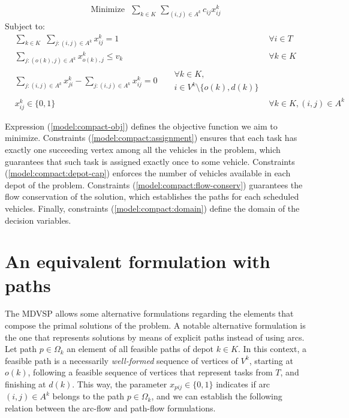 \documentclass{article}
\begin{document}
\noindent
\begin{minipage}{\linewidth}
\begin{align}
   \mathrm{Minimize~~~}\sum_{k \in K} \, \sum_{(i,j) \in A^k} c_{ij} x^k_{ij} \label{model:compact-obj}
\end{align}
\qquad Subject to:
\begin{align}
   & \sum_{k \in K} \,\, \sum_{j:(i,j) \in A^k} x^k_{ij} = 1 & & \forall i \in T \label{model:compact:assignment}\\
   & \sum_{j : (o(k), j) \in A^k} x^k_{o(k), j} \leqslant v_k & & \forall k \in K \label{model:compact:depot-cap}\\
   & \sum_{j : (i,j) \in A^k} x^k_{ji} - \sum_{j : (i,j) \in A^k} x^k_{ij} = 0 &
   \begin{split}
      & \forall k \in K, \\
      & i \in V^k \setminus \{o(k), d(k)\}
   \end{split} \label{model:compact:flow-conserv}\\[4pt]
   & x^k_{ij} \in \{0, 1\} & & \forall k \in K, (i,j) \in A^k \label{model:compact:domain}
\end{align}
\end{minipage}

\vspace*{12pt}

Expression (\ref{model:compact-obj}) defines the objective function we aim to minimize. Constraints (\ref{model:compact:assignment}) ensures that each task has exactly one succeeding vertex among all the vehicles in the problem, which guarantees that such task is assigned exactly once to some vehicle. Constraints (\ref{model:compact:depot-cap}) enforces the number of vehicles available in each depot of the problem. Constraints (\ref{model:compact:flow-conserv}) guarantees the flow conservation of the solution, which establishes the paths for each scheduled vehicles. Finally, constraints (\ref{model:compact:domain}) define the domain of the decision variables.

\section{An equivalent formulation with paths}

The MDVSP allows some alternative formulations regarding the elements that compose the primal solutions of the problem. A notable alternative formulation is the one that represents solutions by means of explicit paths instead of using arcs. Let path $p \in \Omega_k$ an element of all feasible paths of depot $k \in K$. In this context, a feasible path is a necessarily \textit{well-formed} sequence of vertices of $V^k$, starting at $o(k)$, following a feasible sequence of vertices that represent tasks from $T$, and finishing at $d(k)$. This way, the parameter $x_{pij} \in \{0,1\}$ indicates if arc $(i,j) \in A^k$ belongs to the path $p \in \Omega_k$, and we can establish the following relation between the arc-flow and path-flow formulations.
\end{document}
